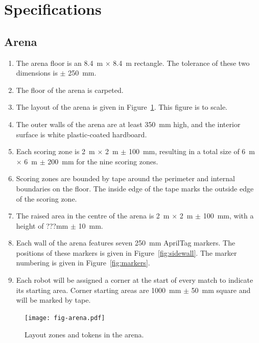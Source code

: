 \section{Specifications}
\label{sec:specs}

\subsection{Arena}
\label{spec:arena}

\begin{enumerate}
  \item The arena floor is an \SI{8.4}{m} $\times$ \SI{8.4}{m} rectangle. The
        tolerance of these two dimensions is $\pm$ \SI{250}{mm}.
  \item The floor of the arena is carpeted.
  \item The layout of the arena is given in Figure~\ref{fig:arena}. This
        figure is to scale.
  \item The outer walls of the arena are at least \SI{350}{mm} high, and the
        interior surface is white plastic-coated hardboard.
  \item Each scoring zone is \SI{2}{m} $\times$ \SI{2}{m} $\pm$ \SI{100}{mm},
        resulting in a total size of \SI{6}{m} $\times$ \SI{6}{m} $\pm$ \SI{200}{mm}
        for the nine scoring zones.
  \item Scoring zones are bounded by tape around the perimeter
        and internal boundaries on the floor. The inside edge of the tape marks the outside
        edge of the scoring zone.
  \item The raised area in the centre of the arena is \SI{2}{m} $\times$ \SI{2}{m} $\pm$ \SI{100}{mm},
        with a height of ???mm $\pm$ \SI{10}{mm}.
  \item Each wall of the arena features seven \SI{250}{mm} AprilTag markers.
        The positions of these markers is given in Figure~\ref{fig:sidewall}.
        The marker numbering is given in Figure~\ref{fig:markers}.
  \item Each robot will be assigned a corner at the start of every match to indicate its starting area.
        Corner starting areas are \SI{1000}{mm} $\pm$ \SI{50}{mm} square and will be marked by tape.
\end{enumerate}

\begin{figure}
  \centering
  \texttt{[image: fig-arena.pdf]}
  \caption{Layout zones and tokens in the arena.}
  \label{fig:arena}
\end{figure}


